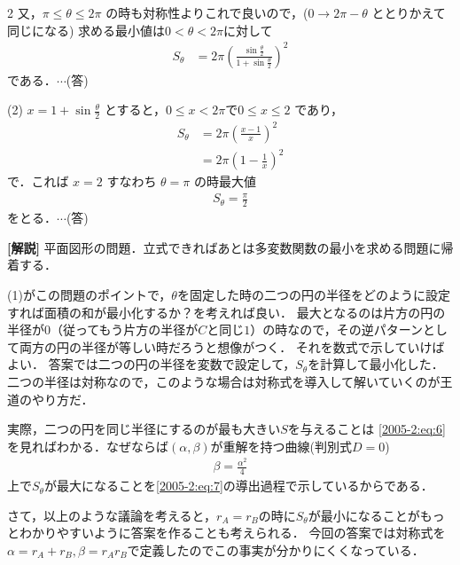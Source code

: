 \documentclass[../../main.tex]{subfiles}
\begin{document}
\begin{multicols}{2}
  \vspace{5pt}
  又，$\pi \le \theta \le 2\pi$ の時も対称性よりこれで良いので，($0 \to 2\pi-\theta$ ととりかえて同じになる)
  求める最小値は$0<\theta<2\pi$に対して
  \begin{align*}
    S_\theta
     & = 2\pi \left(\frac{\sin\frac{\theta}{2}}{1+\sin\frac{\theta}{2}}\right)^2
  \end{align*}
  である．$\cdots$(答)

  \vspace{10pt}
  (2) $x=1+\sin\frac{\theta}{2}$ とすると，$0\le x < 2\pi$で$0 \le x \le 2$ であり，
  \begin{align*}
    S_\theta
     & = 2\pi \left(\frac{x-1}{x}\right)^2 \\
     & = 2\pi \left(1-\frac{1}{x}\right)^2
  \end{align*}
  で．これば $x=2$ すなわち $\theta=\pi$ の時最大値
  \begin{align*}
    S_\theta = \frac{\pi}{2}
  \end{align*}
  をとる．$\cdots$(答)


  \vspace{10pt}
  {\bf[解説]}
  平面図形の問題．立式できればあとは多変数関数の最小を求める問題に帰着する．

  (1)がこの問題のポイントで，$\theta$を固定した時の二つの円の半径をどのように設定すれば面積の和が最小化するか？を考えれば良い．
  最大となるのは片方の円の半径が$0$（従ってもう片方の半径が$C$と同じ$1$）の時なので，その逆パターンとして両方の円の半径が等しい時だろうと想像がつく．
  それを数式で示していけばよい．
  答案では二つの円の半径を変数で設定して，$S_{\theta}$を計算して最小化した．
  二つの半径は対称なので，このような場合は対称式を導入して解いていくのが王道のやり方だ．

  実際，二つの円を同じ半径にするのが最も大きい$S$を与えることは
  \cref{2005-2:eq:6}を見ればわかる．なぜならば$(\alpha,\beta)$が重解を持つ曲線(判別式$D=0$)
  \begin{align*}
    \beta = \frac{\alpha^2}{4}
  \end{align*}
  上で$S_{\theta}$が最大になることを\cref{2005-2:eq:7}の導出過程で示しているからである．

  さて，以上のような議論を考えると，$r_{A}=r_{B}$の時に$S_{\theta}$が最小になることがもっとわかりやすいように答案を作ることも考えられる．
  今回の答案では対称式を$\alpha=r_{A}+r_{B},\beta=r_{A}r_{B}$で定義したのでこの事実が分かりにくくなっている．


\end{multicols}
\end{document}
